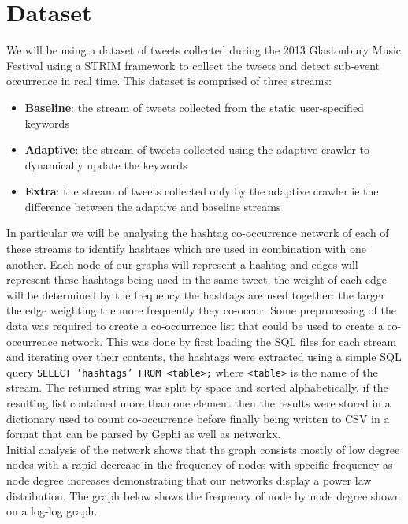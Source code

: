 \documentclass[conference]{IEEEtran}
\begin{document}
\section{Dataset}
	{
		We will be using a dataset of tweets collected during the 2013 Glastonbury Music Festival using a STRIM \cite{strim} framework to collect the tweets and detect sub-event occurrence in real time. This dataset is comprised of three streams: \begin{itemize}
			\item \textbf{Baseline}: the stream of tweets collected from the static user-specified keywords
			\item \textbf{Adaptive}: the stream of tweets collected using the adaptive crawler to dynamically update the keywords
			\item \textbf{Extra}: the stream of tweets collected only by the adaptive crawler ie the difference between the adaptive and baseline streams
		\end{itemize}
		In particular we will be analysing the hashtag co-occurrence network of each of these streams to identify hashtags which are used in combination with one another. Each node of our graphs will represent a hashtag and edges will represent these hashtags being used in the same tweet, the weight of each edge will be determined by the frequency the hashtags are used together: the larger the edge weighting the more frequently they co-occur. Some preprocessing of the data was required to create a co-occurrence list that could be used to create a co-occurrence network. This was done by first loading the SQL files for each stream and iterating over their contents, the hashtags were extracted using a simple SQL query \texttt{SELECT 'hashtags' FROM <table>;} where \texttt{<table>} is the name of the stream. The returned string was split by space and sorted alphabetically, if the resulting list contained more than one element then the results were stored in a dictionary used to count co-occurrence before finally being written to CSV in a format that can be parsed by Gephi as well as networkx. \\
		
		Initial analysis of the network shows that the graph consists mostly of low degree nodes with a rapid decrease in the frequency of nodes with specific frequency as node degree increases demonstrating that our networks display a power law distribution. The graph below shows the frequency of node by node degree shown on a log-log graph. 
	\par}
\end{document}
